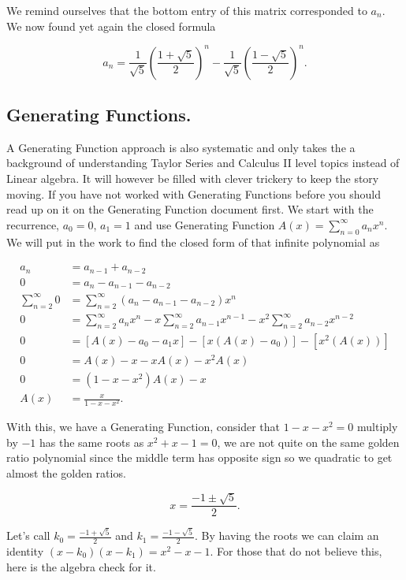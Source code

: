 \documentclass{article}
\begin{document}
We remind ourselves that the bottom entry of this matrix corresponded to $a_n$. We now found yet again the closed formula

\begin{equation*}
    a_n = \frac{1}{\sqrt{5}} \left(\frac{1+\sqrt{5}}{2} \right)^n - \frac{1}{\sqrt{5}} \left(\frac{1-\sqrt{5}}{2} \right)^n.
\end{equation*}

\subsection{Generating Functions.}

A Generating Function approach is also systematic and only takes the a background of understanding Taylor Series and Calculus II level topics instead of Linear algebra. It will however be filled with clever trickery to keep the story moving. If you have not worked with Generating Functions before you should read up on it on the Generating Function document first. We start with the recurrence, $a_0=0$, $a_1=1$ and use Generating Function $A(x)=\sum_{n=0}^{\infty}a_nx^n$. We will put in the work to find the closed form of that infinite polynomial as

\begin{align*}
    a_n &= a_{n-1}+a_{n-2} \\
    0 &= a_n-a_{n-1}-a_{n-2} \\
    \sum_{n=2}^{\infty} 0 &= \sum_{n=2}^{\infty} (a_n-a_{n-1}-a_{n-2})x^n \\
    0 &= \sum_{n=2}^{\infty}a_nx^n-x\sum_{n=2}^{\infty}a_{n-1}x^{n-1}-x^2\sum_{n=2}^{\infty}a_{n-2}x^{n-2} \\
    0 &= [A(x)-a_0-a_1x]-[x(A(x)-a_0)]-[x^2(A(x))] \\
    0 &= A(x)-x-xA(x)-x^2A(x) \\
    0 &= (1-x-x^2)A(x)-x \\
    A(x) &= \frac{x}{1-x-x^2}.
\end{align*}

With this, we have a Generating Function, consider that $1-x-x^2=0$ multiply by $-1$ has the same roots as $x^2+x-1=0$, we are not quite on the same golden ratio polynomial since the middle term has opposite sign so we quadratic to get almost the golden ratios.

\begin{equation*}
    x=\frac{-1 \pm \sqrt{5}}{2}.
\end{equation*}

Let's call $k_0=\frac{-1+\sqrt{5}}{2}$ and $k_1=\frac{-1-\sqrt{5}}{2}$. By having the roots we can claim an identity $(x-k_0)(x-k_1)=x^2-x-1$. For those that do not believe this, here is the algebra check for it.
\end{document}
